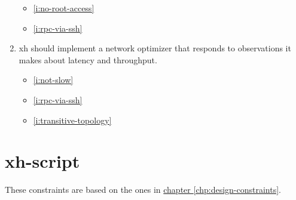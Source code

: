 \documentclass{report}
\makeatletter
\newcommand{\Ref}[2]{\hyperref[#2]{#1 \ref*{#2}}}
\newcommand*{\Label}[2]{%
  \@bsphack
  \begingroup
    \label{#1-original}%
    \def\@currentlabel{#2 [\ref{#1-original}]}%
    \label{#1}%
  \endgroup
  \@esphack
}
\makeatother
\begin{document}
\begin{enumerate}
\begin{itemize}
\item \ref{i:no-root-access}
\item \ref{i:rpc-via-ssh}
\end{itemize}
\item{}\Label{i:network-routing}{routing}
  xh should implement a network optimizer that responds to observations it
  makes about latency and throughput.
\begin{itemize}
\item \ref{i:not-slow}
\item \ref{i:rpc-via-ssh}
\item \ref{i:transitive-topology}
\end{itemize}
\end{enumerate}

\chapter{xh-script}\label{chp:design-xh-script}
  These constraints are based on the ones in
  \Ref{chapter}{chp:design-constraints}.
\end{document}

